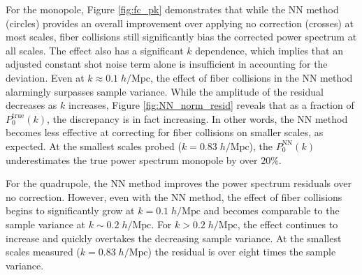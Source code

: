 For the monopole, Figure \ref{fig:fc_pk} demonstrates that while the 
NN method (circles) provides an overall improvement over applying no correction (crosses)
at most scales, fiber collisions still significantly bias the corrected 
power spectrum at all scales. The effect also has a significant $k$ 
dependence, which implies that an adjusted 
constant shot noise term alone is insufficient in accounting for the deviation. 
Even at $k \approx 0.1\;h/\mathrm{Mpc}$, the effect of 
fiber collisions in the NN method alarmingly surpasses sample variance. 
While the amplitude of the residual decreases as $k$ increases, Figure
\ref{fig:NN_norm_resid} reveals that as a fraction of 
$P_0^\mathrm{true}(k)$, the discrepancy is in fact increasing. 
In other words, the NN method becomes less effective at correcting for 
fiber collisions on smaller scales, as expected. At the smallest scales probed 
($k = 0.83\;h/\mathrm{Mpc}$), the $P_0^\mathrm{NN}(k)$ underestimates the 
true power spectrum monopole by over $20\%$. 

For the quadrupole, the NN method improves the power spectrum residuals over 
no correction. However, even with the NN method, the effect of fiber collisions begins 
to significantly grow at $k=0.1\;h/\mathrm{Mpc}$ and becomes comparable to 
the sample variance at $k \sim 0.2\;h/\mathrm{Mpc}$. For $k > 0.2\;h/\mathrm{Mpc}$, 
the effect continues to increase and quickly overtakes the decreasing 
sample variance. At the smallest scales measured ($k = 0.83 \;h/\mathrm{Mpc}$) the 
residual is over eight times the sample variance.

